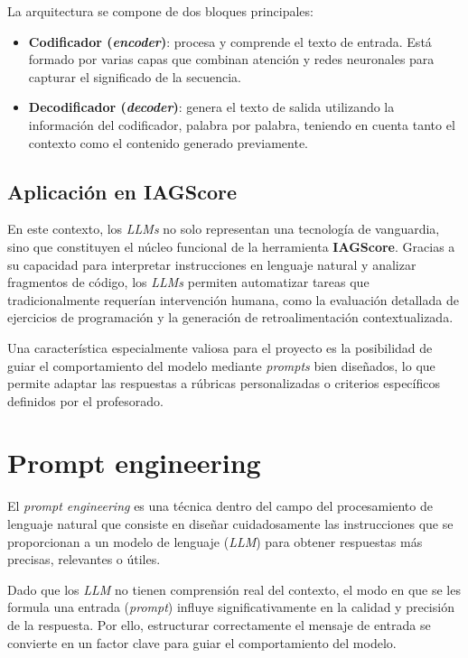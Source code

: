 La arquitectura se compone de dos bloques principales:

\begin{itemize}
    \item \textbf{Codificador (\textit{encoder})}: procesa y comprende el texto de entrada. Está formado por varias capas que combinan atención y redes neuronales para capturar el significado de la secuencia.

    \item \textbf{Decodificador (\textit{decoder})}: genera el texto de salida utilizando la información del codificador, palabra por palabra, teniendo en cuenta tanto el contexto como el contenido generado previamente.
\end{itemize}


\subsection*{Aplicación en IAGScore}

En este contexto, los \textit{LLMs} no solo representan una tecnología de vanguardia, 
sino que constituyen el núcleo funcional de la herramienta \textbf{IAGScore}. 
Gracias a su capacidad para interpretar instrucciones en lenguaje natural y analizar fragmentos de código, los \textit{LLMs} permiten automatizar tareas que tradicionalmente requerían intervención humana, 
como la evaluación detallada de ejercicios de programación y la generación de retroalimentación 
contextualizada.

Una característica especialmente valiosa para el proyecto es la posibilidad de guiar el 
comportamiento del modelo mediante \textit{prompts} bien diseñados, lo que permite adaptar 
las respuestas a rúbricas personalizadas o criterios específicos definidos por el profesorado.

\section{Prompt engineering}

El \textit{prompt engineering} es una técnica dentro del campo del procesamiento de lenguaje natural que consiste en diseñar cuidadosamente las instrucciones que se proporcionan a un modelo de lenguaje (\textit{LLM}) para obtener respuestas más precisas, relevantes o útiles.

Dado que los \textit{LLM} no tienen comprensión real del contexto, el modo en que se les formula una entrada (\textit{prompt}) influye significativamente en la calidad y precisión de la respuesta. Por ello, estructurar correctamente el mensaje de entrada se convierte en un factor clave para guiar el comportamiento del modelo.

